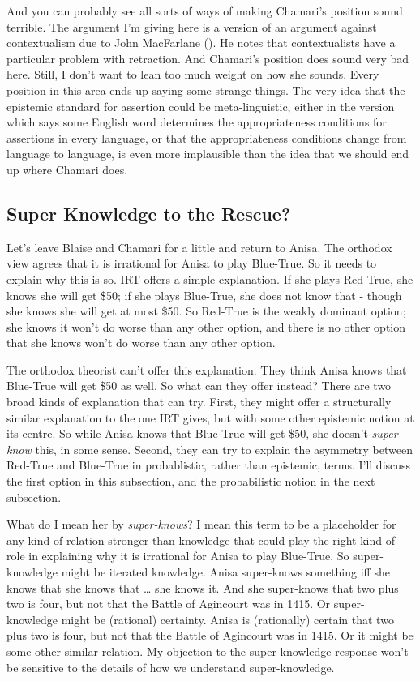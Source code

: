 \documentclass[
  12pt,
  letterpaper,
]{scrbook}
\begin{document}
And you can probably see all sorts of ways of making Chamari's position
sound terrible. The argument I'm giving here is a version of an argument
against contextualism due to John MacFarlane
(). He notes that
contextualists have a particular problem with retraction. And Chamari's
position does sound very bad here. Still, I don't want to lean too much
weight on how she sounds. Every position in this area ends up saying
some strange things. The very idea that the epistemic standard for
assertion could be meta-linguistic, either in the version which says
some English word determines the appropriateness conditions for
assertions in every language, or that the appropriateness conditions
change from language to language, is even more implausible than the idea
that we should end up where Chamari does.

\subsection{Super Knowledge to the Rescue?}\label{sec-superknow}

Let's leave Blaise and Chamari for a little and return to Anisa. The
orthodox view agrees that it is irrational for Anisa to play Blue-True.
So it needs to explain why this is so. IRT offers a simple explanation.
If she plays Red-True, she knows she will get \$50; if she plays
Blue-True, she does not know that - though she knows she will get at
most \$50. So Red-True is the weakly dominant option; she knows it won't
do worse than any other option, and there is no other option that she
knows won't do worse than any other option.

The orthodox theorist can't offer this explanation. They think Anisa
knows that Blue-True will get \$50 as well. So what can they offer
instead? There are two broad kinds of explanation that can try. First,
they might offer a structurally similar explanation to the one IRT
gives, but with some other epistemic notion at its centre. So while
Anisa knows that Blue-True will get \$50, she doesn't \emph{super-know}
this, in some sense. Second, they can try to explain the asymmetry
between Red-True and Blue-True in probablistic, rather than epistemic,
terms. I'll discuss the first option in this subsection, and the
probabilistic notion in the next subsection.

What do I mean her by \emph{super-knows}? I mean this term to be a
placeholder for any kind of relation stronger than knowledge that could
play the right kind of role in explaining why it is irrational for Anisa
to play Blue-True. So super-knowledge might be iterated knowledge. Anisa
super-knows something iff she knows that she knows that \ldots{} she
knows it. And she super-knows that two plus two is four, but not that
the Battle of Agincourt was in 1415. Or super-knowledge might be
(rational) certainty. Anisa is (rationally) certain that two plus two is
four, but not that the Battle of Agincourt was in 1415. Or it might be
some other similar relation. My objection to the super-knowledge
response won't be sensitive to the details of how we understand
super-knowledge.
\end{document}
